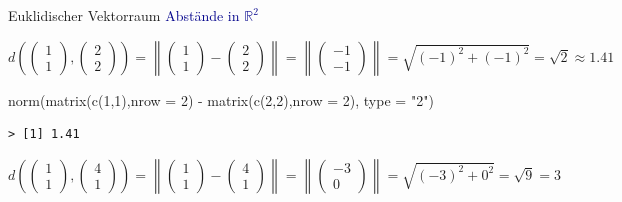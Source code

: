 \documentclass[
  8pt,
  ignorenonframetext,
]{beamer}
\newenvironment{Shaded}{\begin{snugshade}}{\end{snugshade}}
\newcommand{\AttributeTok}[1]{\textcolor[rgb]{0.77,0.63,0.00}{#1}}
\newcommand{\DecValTok}[1]{\textcolor[rgb]{0.00,0.00,0.81}{#1}}
\newcommand{\FunctionTok}[1]{\textcolor[rgb]{0.00,0.00,0.00}{#1}}
\newcommand{\NormalTok}[1]{#1}
\newcommand{\SpecialCharTok}[1]{\textcolor[rgb]{0.00,0.00,0.00}{#1}}
\newcommand{\StringTok}[1]{\textcolor[rgb]{0.31,0.60,0.02}{#1}}
\begin{document}
\begin{frame}[fragile]{Euklidischer Vektorraum}
\protect\hypertarget{euklidischer-vektorraum-7}{}
\textcolor{darkblue}{Abstände in $\mathbb{R}^2$} \footnotesize
\vspace{5mm}

\begin{equation}
d\left(\begin{pmatrix} 1 \\ 1 \end{pmatrix}, \begin{pmatrix} 2 \\ 2 \end{pmatrix}\right)
= \left\lVert \begin{pmatrix}  1 \\ 1 \end{pmatrix} - \begin{pmatrix} 2 \\ 2 \end{pmatrix} \right\rVert
= \left\lVert \begin{pmatrix} -1 \\ -1 \end{pmatrix}  \right\rVert
= \sqrt{(-1)^2 + (-1)^2}
= \sqrt{2}
\approx 1.41
\end{equation}

\begin{Shaded}
\begin{Highlighting}[]
\FunctionTok{norm}\NormalTok{(}\FunctionTok{matrix}\NormalTok{(}\FunctionTok{c}\NormalTok{(}\DecValTok{1}\NormalTok{,}\DecValTok{1}\NormalTok{),}\AttributeTok{nrow =} \DecValTok{2}\NormalTok{) }\SpecialCharTok{{-}} \FunctionTok{matrix}\NormalTok{(}\FunctionTok{c}\NormalTok{(}\DecValTok{2}\NormalTok{,}\DecValTok{2}\NormalTok{),}\AttributeTok{nrow =} \DecValTok{2}\NormalTok{), }\AttributeTok{type =} \StringTok{"2"}\NormalTok{)}
\end{Highlighting}
\end{Shaded}

\begin{verbatim}
> [1] 1.41
\end{verbatim}

\vspace{5mm}

\begin{equation}
d\left(\begin{pmatrix} 1 \\ 1 \end{pmatrix}, \begin{pmatrix} 4 \\ 1 \end{pmatrix}\right)
= \left\lVert \begin{pmatrix}  1 \\ 1 \end{pmatrix} - \begin{pmatrix} 4 \\ 1 \end{pmatrix} \right\rVert
= \left\lVert \begin{pmatrix} -3 \\ 0 \end{pmatrix} \right\rVert
= \sqrt{(-3)^2 + 0^2}
= \sqrt{9}
= 3
\end{equation}


\end{frame}
\end{document}
